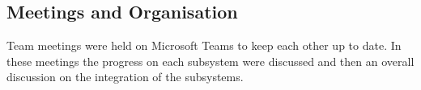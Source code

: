 \subsection{Meetings and Organisation}
Team meetings were held on Microsoft Teams to keep each other up to date. 
In these meetings the progress on each subsystem were discussed 
and then an overall discussion on the integration of the subsystems.